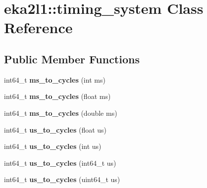 \hypertarget{classeka2l1_1_1timing__system}{}\section{eka2l1\+:\+:timing\+\_\+system Class Reference}
\label{classeka2l1_1_1timing__system}
\subsection*{Public Member Functions}
\begin{DoxyCompactItemize}
\item 
\mbox{\label{classeka2l1_1_1timing__system_a831f82566a9747d8e47f3f31325174ab}} 
int64\+\_\+t {\bfseries ms\+\_\+to\+\_\+cycles} (int ms)
\item 
\mbox{\label{classeka2l1_1_1timing__system_affddfe5694e8d47d32ed052e6efa4f88}} 
int64\+\_\+t {\bfseries ms\+\_\+to\+\_\+cycles} (float ms)
\item 
\mbox{\label{classeka2l1_1_1timing__system_aff655fcfd8ede861008b7b7ffd18b437}} 
int64\+\_\+t {\bfseries ms\+\_\+to\+\_\+cycles} (double ms)
\item 
\mbox{\label{classeka2l1_1_1timing__system_aedf68406392aea89446675ad9ed3d5e0}} 
int64\+\_\+t {\bfseries us\+\_\+to\+\_\+cycles} (float us)
\item 
\mbox{\label{classeka2l1_1_1timing__system_af8017b8e571106dbe05c960415a90777}} 
int64\+\_\+t {\bfseries us\+\_\+to\+\_\+cycles} (int us)
\item 
\mbox{\label{classeka2l1_1_1timing__system_a6e95e837ab0522d98f305ba91f7a26d0}} 
int64\+\_\+t {\bfseries us\+\_\+to\+\_\+cycles} (int64\+\_\+t us)
\item 
\mbox{\label{classeka2l1_1_1timing__system_ae8858bf656f60db3e3eea181a8eec409}} 
int64\+\_\+t {\bfseries us\+\_\+to\+\_\+cycles} (uint64\+\_\+t us)
\item 
\mbox{\label{classeka2l1_1_1timing__system_a4b9797d9585b9ed6b475e61ceb32944c}} 

\end{DoxyCompactItemize}
